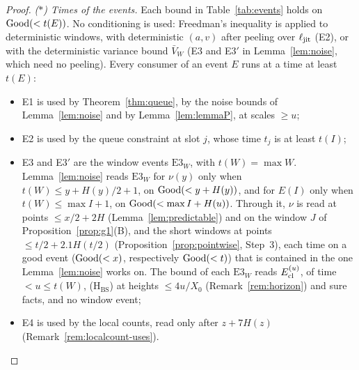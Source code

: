\begin{proof}
\emph{($*$) Times of the events.} Each bound in Table~\ref{tab:events} holds on $\mathrm{Good}(<t(E))$. No conditioning is used: Freedman's
inequality is applied to deterministic windows, with deterministic $(a,v)$ after peeling over $\ell_{\mathrm{jit}}$ (E2), or with the deterministic variance bound $\bar V_W$ (E3 and
E3$'$ in Lemma~\ref{lem:noise}, which need no peeling). Every consumer of an event $E$ runs at a time at least $t(E)$:
\begin{itemize}
\item E1 is used by Theorem~\ref{thm:queue}, by the noise bounds of Lemma~\ref{lem:noise} and by Lemma~\ref{lem:lemmaP}, at scales $\ge u$;
\item E2 is used by the queue constraint at slot $j$, whose time $t_j$ is at least $t(I)$;
\item E3 and E3$'$ are the window events $\mathrm{E3}_W$, with $t(W)=\max W$. Lemma~\ref{lem:noise} reads $\mathrm{E3}_W$ for $\nu(y)$ only
  when $t(W)\le y+H(y)/2+1$, on $\mathrm{Good}(<y+H(y))$, and for $E(I)$ only when $t(W)\le\max I+1$, on $\mathrm{Good}(<\max I+H(u))$. Through it,
  $\nu$ is read at points $\le x/2+2H$ (Lemma~\ref{lem:predictable}) and on the window $J$ of Proposition~\ref{prop:g1}(B), and the
  short windows at points $\le t/2+2.1H(t/2)$ (Proposition~\ref{prop:pointwise}, Step~3), each time on a good event ($\mathrm{Good}(<x)$,
  respectively $\mathrm{Good}(<t)$) that is contained in the one Lemma~\ref{lem:noise} works on. The bound of each $\mathrm{E3}_W$ reads $E_{\mathrm{cl}}^{(u)}$, of time $<u\le t(W)$, \textup{(H$_{\mathrm{BS}}$)} at heights $\le4u/X_0$
(Remark~\ref{rem:horizon}) and sure facts, and no window event;
\item E4 is used by the local counts, read only after $z+7H(z)$ (Remark~\ref{rem:localcount-uses}).
\end{itemize}


\end{proof}
